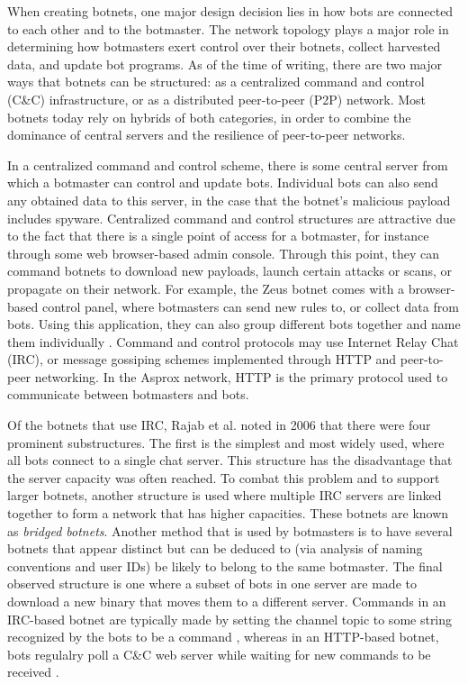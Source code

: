\documentclass{acm_proc_article-sp}
\begin{document}
When creating botnets, one major design decision lies in how bots are connected to each other and to the botmaster. The network topology plays a major role in determining how botmasters exert control over their botnets, collect harvested data, and update bot programs. As of the time of writing, there are two major ways that botnets can be structured: as a centralized command and control (C\&C) infrastructure, or as a distributed peer-to-peer (P2P) network.  Most botnets today rely on hybrids of both categories, in order to combine the dominance of central servers and the resilience of peer-to-peer networks\cite{stone:p2p}\cite{defcon:prowling}.

In a centralized command and control scheme, there is some central server from which a botmaster can control and update bots. Individual bots can also send any obtained data to this server, in the case that the botnet's malicious payload includes spyware. Centralized command and control structures are attractive due to the fact that there is a single point of access for a botmaster, for instance through some web browser-based admin console. Through this point, they can command botnets to download new payloads, launch certain attacks or scans, or propagate on their network. For example, the Zeus botnet comes with a browser-based control panel, where botmasters can send new rules to, or collect data from bots. Using this application, they can also group different bots together and name them individually \cite{blackhat:zeus}. Command and control protocols may use Internet Relay Chat (IRC), or message gossiping schemes implemented through HTTP and peer-to-peer networking.  In the Asprox network, HTTP is the primary protocol used to communicate between botmasters and bots\cite{borgaonkar:analysis}. 

Of the botnets that use IRC, Rajab et al. noted in 2006  \cite{rajab:botnets} that there were four prominent substructures. The first is the simplest and most widely used, where all bots connect to a single chat server. This structure has the disadvantage that the server capacity was often reached. To combat this problem and to support larger botnets, another structure is used where multiple IRC servers are linked together to form a network that has higher capacities. These botnets are known as \emph{bridged botnets}. Another method that is used by botmasters is to have several botnets that appear distinct but can be deduced to (via analysis of naming conventions and user IDs) be likely to belong to the same botmaster. The final observed structure is one where a subset of bots in one server are made to download a new binary that moves them to a different server. Commands in an IRC-based botnet are typically made by setting the channel topic to some string recognized by the bots to be a command \cite{honeynet:appendix}, whereas in an HTTP-based botnet, bots regulalry poll a C\&C web server while waiting for new commands to be received \cite{borgaonkar:analysis}.
\end{document}
